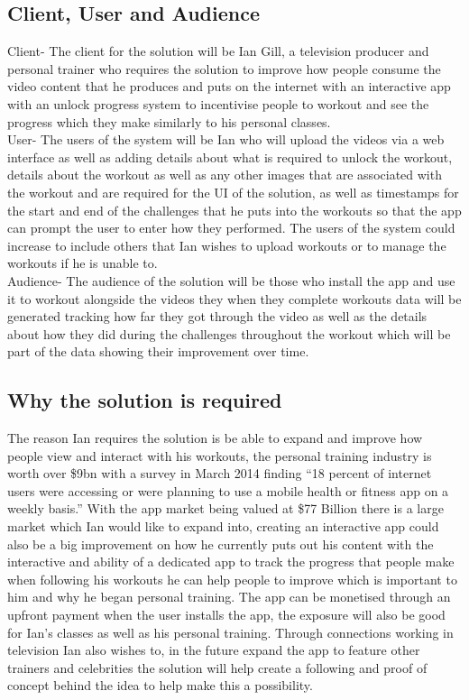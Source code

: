 \documentclass[a4paper]{article}
\begin{document}
	\subsection{Client, User and Audience}
	Client- The client for the solution will be Ian Gill, a television producer and personal trainer who requires the solution to improve how people consume the video content that he produces and puts on the internet with an interactive app with an unlock progress system to incentivise people to workout and see the progress which they make similarly to his personal classes. \\
	User- The users of the system will be Ian who will upload the videos via a web interface as well as adding details about what is required to unlock the workout, details about the workout as well as any other images that are associated with the workout and are required for the UI of the solution, as well as timestamps for the start and end of the challenges that he puts into the workouts so that the app can prompt the user to enter how they performed. The users of the system could increase to include others that Ian wishes to upload workouts or to manage the workouts if he is unable to. \\
	Audience- The audience of the solution will be those who install the app and use it to workout alongside the videos they when they complete workouts data will be generated tracking how far they got through the video as well as the details about how they did during the challenges throughout the workout which will be part of the data showing their improvement over time.

	\subsection{Why the solution is required}
	The reason Ian requires the solution is be able to expand and improve how people view and interact with his workouts, the personal training industry is worth over \$9bn with a survey in March 2014 finding “18 percent of internet users were accessing or were planning to use a mobile health or fitness app on a weekly basis.” With the app market being valued at \$77 Billion there is a large market which Ian would like to expand into, creating an interactive app could also be a big improvement on how he currently puts out his content with the interactive and ability of a dedicated app to track the progress that people make when following his workouts he can help people to improve which is important to him and why he began personal training. The app can be monetised through an upfront payment when the user installs the app, the exposure will also be good for Ian’s classes as well as his personal training. Through connections working in television Ian also wishes to, in the future expand the app to feature other trainers and celebrities the solution will help create a following and proof of concept behind the idea to help make this a possibility.
\end{document}
